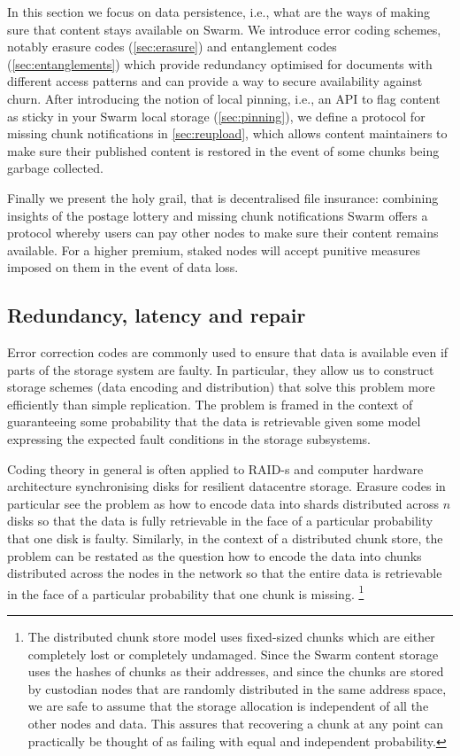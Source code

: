 In this section we focus on data persistence, i.e., what are the ways of making sure that content stays available on Swarm. 
We introduce error coding schemes, notably erasure codes (\ref{sec:erasure}) and entanglement codes (\ref{sec:entanglements}) which provide redundancy optimised for documents with different access patterns and can provide a way to secure availability against churn. 
After introducing the notion of local pinning, i.e., an API to flag content as sticky in your Swarm local storage (\ref{sec:pinning}), we define a protocol for missing chunk notifications in \ref{sec:reupload}, which allows content maintainers to make sure their published content is restored in the event of some chunks being garbage collected.

Finally we present the holy grail, that is decentralised file insurance: combining insights of the postage lottery and missing chunk notifications Swarm offers a protocol whereby users can pay other nodes to make sure their content remains available. For a higher premium, staked nodes will accept punitive measures imposed on them in the event of data loss.


\subsection{Redundancy, latency and repair}\label{sec:repair}

Error correction codes are commonly used to ensure that data is available even if parts of the storage system are faulty. In particular, they allow us to construct storage schemes (data encoding and distribution) that solve this problem more efficiently than simple replication. The problem is framed in the context of guaranteeing some probability that the data is retrievable given some model expressing the expected fault conditions in the storage subsystems.

Coding theory in general is often applied to RAID-s and computer hardware architecture synchronising disks for resilient datacentre storage.
Erasure codes in particular see the problem as how to encode data into shards distributed across $n$ disks so that the data is fully retrievable in the face of a particular probability that one disk is faulty.
Similarly, in the context of a distributed chunk store, the problem can be restated as the question how to encode the data into chunks distributed across the nodes in the network so that the entire data is retrievable in the face of a particular probability that one chunk is missing.%
%
\footnote{The distributed chunk store model uses fixed-sized chunks which are either completely lost or completely undamaged. Since the Swarm content storage uses the hashes of chunks as their addresses, and since the chunks are stored by custodian nodes that are randomly distributed in the same address space, we are safe to assume that the storage allocation is independent of all the other nodes and data. This assures that recovering a chunk at any point can practically be thought of as failing with equal and independent probability.}

